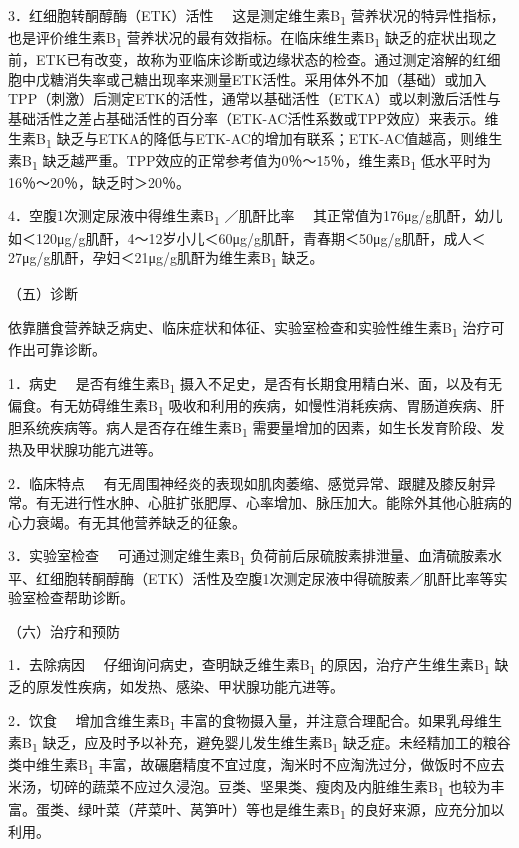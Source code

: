 {3．红细胞转酮醇酶（ETK）活性} 　这是测定维生素B\textsubscript{1}
营养状况的特异性指标，也是评价维生素B\textsubscript{1}
营养状况的最有效指标。在临床维生素B\textsubscript{1}
缺乏的症状出现之前，ETK已有改变，故称为亚临床诊断或边缘状态的检查。通过测定溶解的红细胞中戊糖消失率或己糖出现率来测量ETK活性。采用体外不加（基础）或加入TPP（刺激）后测定ETK的活性，通常以基础活性（ETKA）或以刺激后活性与基础活性之差占基础活性的百分率（ETK-AC活性系数或TPP效应）来表示。维生素B\textsubscript{1}
缺乏与ETKA的降低与ETK-AC的增加有联系；ETK-AC值越高，则维生素B\textsubscript{1}
缺乏越严重。TPP效应的正常参考值为0％～15％，维生素B\textsubscript{1}
低水平时为16％～20％，缺乏时＞20％。

{4．空腹1次测定尿液中得维生素B\textsubscript{1} ／肌酐比率}
　其正常值为176μg/g肌酐，幼儿如＜120μg/g肌酐，4～12岁小儿＜60μg/g肌酐，青春期＜50μg/g肌酐，成人＜27μg/g肌酐，孕妇＜21μg/g肌酐为维生素B\textsubscript{1}
缺乏。

（五）诊断

依靠膳食营养缺乏病史、临床症状和体征、实验室检查和实验性维生素B\textsubscript{1}
治疗可作出可靠诊断。

{1．病史} 　是否有维生素B\textsubscript{1}
摄入不足史，是否有长期食用精白米、面，以及有无偏食。有无妨碍维生素B\textsubscript{1}
吸收和利用的疾病，如慢性消耗疾病、胃肠道疾病、肝胆系统疾病等。病人是否存在维生素B\textsubscript{1}
需要量增加的因素，如生长发育阶段、发热及甲状腺功能亢进等。

{2．临床特点}
　有无周围神经炎的表现如肌肉萎缩、感觉异常、跟腱及膝反射异常。有无进行性水肿、心脏扩张肥厚、心率增加、脉压加大。能除外其他心脏病的心力衰竭。有无其他营养缺乏的征象。

{3．实验室检查} 　可通过测定维生素B\textsubscript{1}
负荷前后尿硫胺素排泄量、血清硫胺素水平、红细胞转酮醇酶（ETK）活性及空腹1次测定尿液中得硫胺素／肌酐比率等实验室检查帮助诊断。

（六）治疗和预防

{1．去除病因} 　仔细询问病史，查明缺乏维生素B\textsubscript{1}
的原因，治疗产生维生素B\textsubscript{1}
缺乏的原发性疾病，如发热、感染、甲状腺功能亢进等。

{2．饮食} 　增加含维生素B\textsubscript{1}
丰富的食物摄入量，并注意合理配合。如果乳母维生素B\textsubscript{1}
缺乏，应及时予以补充，避免婴儿发生维生素B\textsubscript{1}
缺乏症。未经精加工的粮谷类中维生素B\textsubscript{1}
丰富，故碾磨精度不宜过度，淘米时不应淘洗过分，做饭时不应去米汤，切碎的蔬菜不应过久浸泡。豆类、坚果类、瘦肉及内脏维生素B\textsubscript{1}
也较为丰富。蛋类、绿叶菜（芹菜叶、莴笋叶）等也是维生素B\textsubscript{1}
的良好来源，应充分加以利用。

